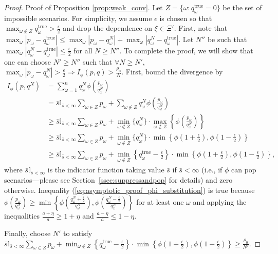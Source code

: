 \documentclass[opre,nonblindrev]{informs3} %
\newcommand{\qtrue}{q^{\text{true}}}
\begin{document}
\begin{proof}{\sc Proof of Proposition \ref{prop:weak_conv}.}
	Let $Z = \{\omega : \qtrue_\omega = 0\}$ be the set of impossible scenarios.
	For simplicity, we assume $\epsilon$ is chosen so that $\max_{\omega \notin Z} \qtrue_\omega > \frac{\epsilon}{2}$ and drop the dependence on $\xi \in \Xi'$.	
	First, note that $\max_\omega |p_\omega - \qtrue_\omega| \leq \max_\omega |p_\omega - q^N_\omega| + \max_\omega |q^N_\omega - \qtrue_\omega|$.
	Let $N''$ be such that $\max_\omega |q^N_\omega - \qtrue_\omega| \leq \frac{\epsilon}{2}$ for all $N \geq N''$.
	To complete the proof, we will show that one can choose $N' \geq N''$ such that $\forall N \geq N'$, $\max_\omega |p_\omega - q^N_\omega| > \frac{\epsilon}{2} \Rightarrow I_\phi(p,q) > \frac{\rho_0}{N}$.
	First, bound the divergence by
	\begin{align}
		I_{\phi}(p,q^N) & = \sum_{\omega=1}^n q^N_\omega \phi\left( \frac{p_\omega}{q^N_\omega} \right) \nonumber \\
		& = \bar{s} \mathbb{I}_{\bar{s} < \infty} \sum_{\omega \in Z} p_\omega + \sum_{\omega \notin Z} q^N_\omega \phi\left( \frac{p_\omega}{q^N_\omega} \right) \nonumber \\
		& \geq \bar{s} \mathbb{I}_{\bar{s} < \infty} \sum_{\omega \in Z} p_\omega + \min_{\omega \notin Z} \{q^N_\omega\} \cdot \max_{\omega \notin Z} \left\{ \phi \left( \frac{p_\omega}{q^N_\omega} \right) \right\} \nonumber \\
		& \geq \bar{s} \mathbb{I}_{\bar{s} < \infty} \sum_{\omega \in Z} p_\omega  + \min_{\omega \notin Z} \{q^N_\omega\} \cdot \min\left\{ \phi\left(1+\frac{\epsilon}{2}\right), \phi\left(1-\frac{\epsilon}{2}\right) \right\} \label{eq:asymptotic_proof_phi_substitution} \\
		& \geq \bar{s} \mathbb{I}_{\bar{s} < \infty} \sum_{\omega \in Z} p_\omega + \min_{\omega \notin Z} \left\{ \qtrue_\omega - \frac{\epsilon}{2} \right\} \cdot \min\left\{ \phi\left(1+\frac{\epsilon}{2}\right), \phi\left(1-\frac{\epsilon}{2}\right) \right\} \nonumber,
	\end{align}
	where $\bar{s}\mathbb{I}_{\bar{s} < \infty}$ is the indicator function taking value $\bar{s}$ if $\bar{s} < \infty$ (i.e., if $\phi$ can pop scenarios---please see Section~\ref{ssec:suppressandpop} for details) and zero otherwise.	
	Inequality (\ref{eq:asymptotic_proof_phi_substitution}) is true because $\phi \left( \frac{p_\omega}{q^N_\omega} \right) \geq \min\left\{ \phi\left( \frac{q^N_\omega+\tfrac{\epsilon}{2}}{q^N_\omega} \right), \phi\left( \frac{q^N_\omega-\tfrac{\epsilon}{2}}{q^N_\omega} \right) \right\}$ for at least one $\omega$ and applying the inequalities $\frac{a+\eta}{a} \geq 1 + \eta$ and $\frac{a-\eta}{a} \leq 1-\eta$.
	
	Finally, choose $N'$ to satisfy $\bar{s} \mathbb{I}_{\bar{s} < \infty} \sum_{\omega \in Z} p_\omega + \min_{\omega \notin Z} \left\{ \qtrue_\omega - \frac{\epsilon}{2} \right\} \cdot \min\left\{ \phi\left(1+\frac{\epsilon}{2}\right), \phi\left(1-\frac{\epsilon}{2}\right) \right\} \geq \frac{\rho_0}{N'}$.
	\Halmos
\end{proof}
\end{document}
